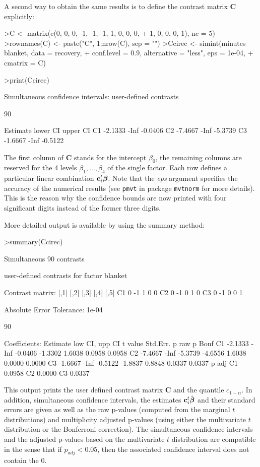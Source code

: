 \documentclass{article}
\newcommand{\bbeta}{\mbox{\boldmath $\beta$}}
\newcommand{\bc}{{\mathbf{c}}}
\newcommand{\bC}{{\mathbf{C}}}
\begin{document}
A second way to obtain the same results is to define the contrast
matrix $\bC$ explicitly:
\small
\begin{Sinput}
>C <- matrix(c(0, 0, 0, -1, -1, -1, 1, 0, 0, 0, 
+     1, 0, 0, 0, 1), nc = 5)
>rownames(C) <- paste("C", 1:nrow(C), sep = "")
>Ccirec <- simint(minutes ~ blanket, data = recovery, 
+     conf.level = 0.9, alternative = "less", eps = 1e-04, 
+     cmatrix = C)
\end{Sinput}
\begin{Sinput}
>print(Ccirec)
\end{Sinput}
\begin{Soutput}
	Simultaneous confidence intervals: user-defined
	contrasts

	90 % confidence intervals

   Estimate lower CI upper CI
C1  -2.1333     -Inf  -0.0406
C2  -7.4667     -Inf  -5.3739
C3  -1.6667     -Inf  -0.5122
\end{Soutput}
\normalsize
The first column of $\bC$ stands for the intercept $\beta_0$, the
remaining columns are reserved for the 4 levels $\beta_1, \dots,
\beta_4$ of the single factor. Each row defines a particular
linear combination $\bc_i^t \bbeta$. Note that the {\em eps} argument
specifies the accuracy of the numerical results (see \texttt{pmvt} in package
\texttt{mvtnorm} for more details). This is the reason why
the confidence bounds are now printed with four significant digits 
instead of the former three digits.

More detailed output is available by using the summary method:
\small
\begin{Sinput}
>summary(Ccirec)
\end{Sinput}
\begin{Soutput}
	Simultaneous 90% confidence intervals: user-defined
	contrasts

	 user-defined contrasts for factor blanket

Contrast matrix:
   [,1] [,2] [,3] [,4] [,5]
C1    0   -1    1    0    0
C2    0   -1    0    1    0
C3    0   -1    0    0    1

Absolute Error Tolerance:  1e-04 

 90 % quantile:  1.3049 

Coefficients:
   Estimate low CI,  upp CI t value Std.Err.  p raw p Bonf
C1  -2.1333    -Inf -0.0406 -1.3302   1.6038 0.0958 0.0958
C2  -7.4667    -Inf -5.3739 -4.6556   1.6038 0.0000 0.0000
C3  -1.6667    -Inf -0.5122 -1.8837   0.8848 0.0337 0.0337
    p adj
C1 0.0958
C2 0.0000
C3 0.0337
\end{Soutput}
\normalsize
This output prints the user defined contrast matrix $\bC$ 
and the quantile $c_{1-\alpha}$. In addition,
simultaneous confidence intervals, the estimates $\bc_i^t
\hat{\bbeta}$ and their standard errors are given as well as the raw
p-values (computed from the marginal $t$ distributions) and
multiplicity adjusted p-values (using either the multivariate $t$ distribution or
the Bonferroni correction). The simultaneous confidence intervals
and the adjusted p-values based on the multivariate $t$ distribution are compatible in
the sense that if $p_{adj}<0.05$, then the associated confidence
interval does not contain the 0.
\end{document}
